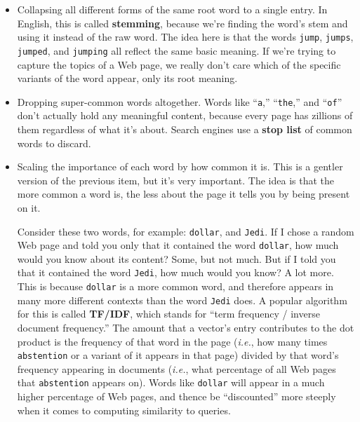 \begin{alttitles}
\begin{itemize}

\item Collapsing all different forms of the same root word to a single entry.
In English, this is called \textbf{stemming}, because we're finding the word's
stem and using it instead of the raw word. The idea here is that the words
\texttt{jump}, \texttt{jumps}, \texttt{jumped}, and \texttt{jumping} all
reflect the same basic meaning. If we're trying to capture the topics of a Web
page, we really don't care which of the specific variants of the word appear,
only its root meaning.


\item Dropping super-common words altogether. Words like ``\texttt{a},''
``\texttt{the},'' and ``\texttt{of}'' don't actually hold any meaningful
content, because every page has zillions of them regardless of what it's about.
Search engines use a \textbf{stop list} of common words to discard.


\item Scaling the importance of each word by how common it is. This is a
gentler version of the previous item, but it's very important. The idea is that
the more common a word is, the less about the page it tells you by being
present on it.

Consider these two words, for example: \texttt{dollar}, and \texttt{Jedi}. If I
chose a random Web page and told you only that it contained the word
\texttt{dollar}, how much would you know about its content? Some, but not much.
But if I told you that it contained the word \texttt{Jedi}, how much would you
know? A lot more. This is because \texttt{dollar} is a more common word, and
therefore appears in many more different contexts than the word \texttt{Jedi}
does. A popular algorithm for this is called \textbf{TF/IDF}, which stands for
``term frequency / inverse document frequency.'' The amount that a vector's
entry contributes to the dot product is the frequency of that word in the page
(\textit{i.e.}, how many times \texttt{abstention} or a variant of it appears
in that page) divided by that word's frequency appearing in documents
(\textit{i.e.}, what percentage of all Web pages that \texttt{abstention}
appears on). Words like \texttt{dollar} will appear in a much higher percentage
of Web pages, and thence be ``discounted'' more steeply when it comes to
computing similarity to queries.

\end{itemize}


\end{alttitles}
